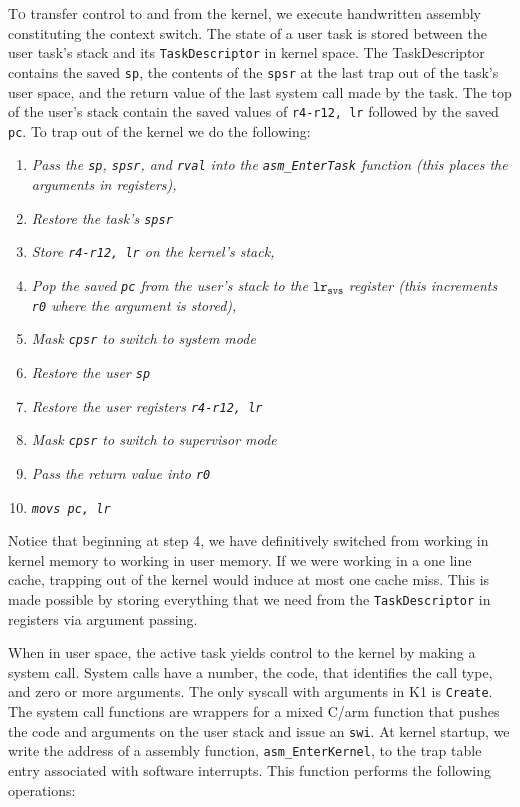 \documentclass{amsart}
\begin{document}
\textsc{To} transfer control to and from the kernel, we execute handwritten assembly
constituting the context switch. The state of a user task is stored between the
user task's stack and its \texttt{TaskDescriptor} in kernel space. The
TaskDescriptor contains the saved \texttt{sp}, the contents of the \texttt{spsr}
at the last trap out of the task's user space, and the return value of the last
system call made by the task. The top of the user's stack contain the saved
values of \texttt{r4-r12, lr} followed by the saved \texttt{pc}. To trap out of
the kernel we do the following:
\begin{enumerate}
	\item \textit{Pass the \texttt{sp}, \texttt{spsr}, and \texttt{rval} into
		the \texttt{asm\_EnterTask} function (this places the arguments in
		registers),}
	\item \textit{Restore the task's \texttt{spsr}}
	\item \textit{Store \texttt{r4-r12, lr} on the kernel's stack,}
	\item \textit{Pop the saved \texttt{pc} from the user's stack to the
		$\texttt{lr}_\texttt{svs}$ register (this increments \texttt{r0} where
		the argument is stored),}
	\item \textit{Mask \texttt{cpsr} to switch to system mode}
	\item \textit{Restore the user \texttt{sp}}
	\item \textit{Restore the user registers \texttt{r4-r12, lr}}
	\item \textit{Mask \texttt{cpsr} to switch to supervisor mode}
	\item \textit{Pass the return value into \texttt{r0}}
	\item \textit{\texttt{movs pc, lr}}
\end{enumerate}

Notice that beginning at step 4, we have definitively switched from working in
kernel memory to working in user memory. If we were working in a one line
cache, trapping out of the kernel would induce at most one cache miss. This is
made possible by storing everything that we need from the
\texttt{TaskDescriptor} in registers via argument passing.

When in user space, the active task yields control to the kernel by making a
system call. System calls have a number, the code, that identifies the call
type, and zero or more arguments. The only syscall with arguments in K1 is
\texttt{Create}. The system call functions are wrappers for a mixed C/arm
function that pushes the code and arguments on the user stack and issue an
\texttt{swi}. At kernel startup, we write the address of a assembly function,
\texttt{asm\_EnterKernel}, to the trap table entry associated with software
interrupts. This function performs the following operations:
\end{document}
